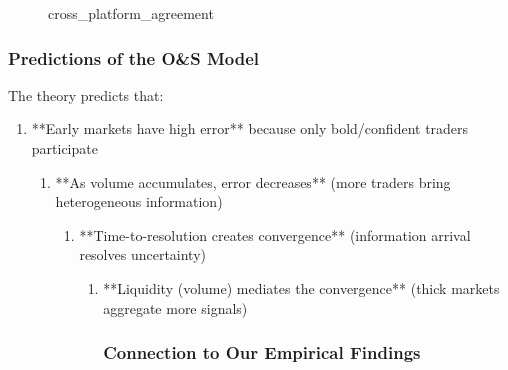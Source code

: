 \documentclass[a4paper,11pt]{article}
\theoremstyle{plain}
\theoremstyle{definition}
\begin{document}
\begin{itemize}
\begin{itemize}
\begin{itemize}
\begin{itemize}
\begin{itemize}
{{\begin{enumerate}
\begin{enumerate}
\begin{enumerate}
{{\begin{itemize}
\begin{itemize}
\begin{itemize}
\begin{itemize}
\begin{itemize}
\begin{figure}[h]
\centering

\caption{cross_platform_agreement}
\label{fig:cross_platform_agreement}
\end{figure}



\subsubsection{Predictions of the O&S Model}


The theory predicts that:
\begin{enumerate}
\item **Early markets have high error** because only bold/confident traders participate
\begin{enumerate}
\item **As volume accumulates, error decreases** (more traders bring heterogeneous information)
\begin{enumerate}
\item **Time-to-resolution creates convergence** (information arrival resolves uncertainty)
\begin{enumerate}
\item **Liquidity (volume) mediates the convergence** (thick markets aggregate more signals)

\subsubsection{Connection to Our Empirical Findings}



\end{enumerate}
\end{enumerate}
\end{enumerate}
\end{enumerate}
\end{itemize}
\end{itemize}
\end{itemize}
\end{itemize}
\end{itemize}}}
\end{enumerate}
\end{enumerate}
\end{enumerate}}}
\end{itemize}
\end{itemize}
\end{itemize}
\end{itemize}
\end{itemize}
\end{document}
